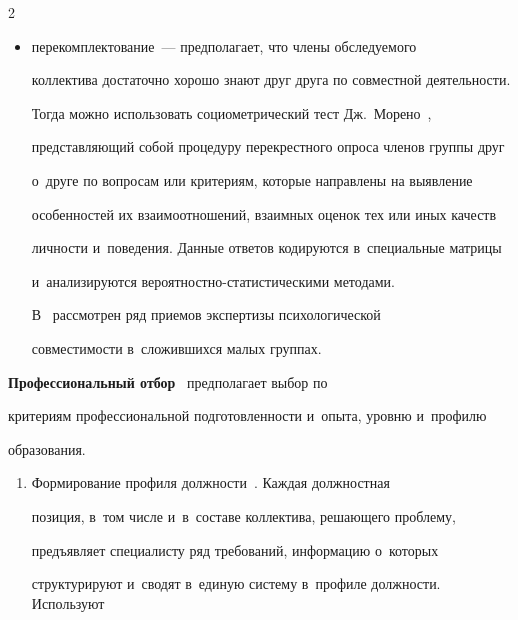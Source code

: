 \begin{multicols}{2}
\begin{enumerate}[1.]
\begin{itemize}
парных взаимодействий, а~психологический тип человека проявляется во 

взаимодействии с~другими людьми;\\ [-14pt]

\item перекомплектование~--- предполагает, что члены об\-сле\-ду\-емо\-го 

коллектива достаточно хорошо знают друг друга по со\-вмест\-ной дея\-тель\-ности. 

Тогда мож\-но использовать со\-цио\-мет\-ри\-че\-ский тест Дж.~Морено~\cite{21-r}, 

пред\-став\-ля\-ющий собой процедуру пе\-ре\-крест\-но\-го опроса членов группы друг 

о~друге по вопросам или критериям, которые на\-прав\-ле\-ны на выявление 

особенностей их взаимоотношений, взаимных оценок тех или иных качеств 

лич\-ности и~поведения. Данные ответов кодируются в~специальные мат\-ри\-цы 

и~анализируются ве\-ро\-ят\-ност\-но-ста\-ти\-сти\-че\-ски\-ми методами. 

В~\cite{22-r, 23-r, 24-r} рас\-смот\-рен ряд приемов экспертизы психологической 

со\-вмес\-ти\-мости в~сло\-жив\-ших\-ся малых группах.\\[-14pt]

\end{itemize}

\end{enumerate}

  

  \textbf{Профессиональный отбор}~\cite{7-r} предполагает выбор по 

критериям профессиональной под\-го\-тов\-лен\-ности и~опыта, уровню и~профилю 

образования. 

  \begin{enumerate}[1.]

\item Формирование профиля должности~\cite{6-r}. Каждая должностная 

позиция, в~том чис\-ле и~в~со\-ста\-ве коллектива, ре\-ша\-юще\-го проб\-ле\-му, 

предъявляет специалисту ряд требований, информацию о~которых 

структурируют и~сводят в~единую сис\-те\-му в~профиле долж\-ности. Используют 


\end{enumerate}
\end{multicols}
